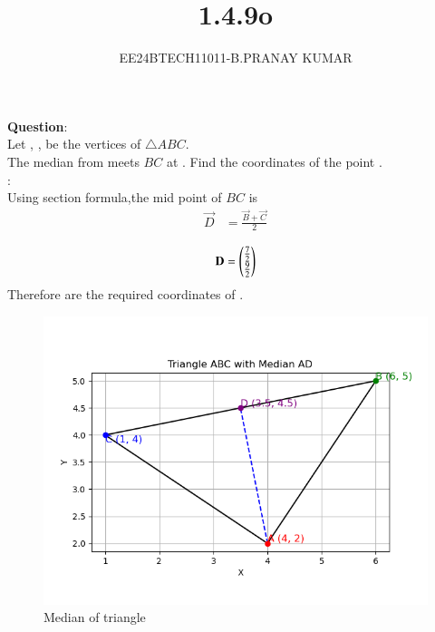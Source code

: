 \documentclass[journal]{IEEEtran}
\begin{document}

\vspace{3cm}

\title{1.4.9o}
\author{EE24BTECH11011-B.PRANAY KUMAR
}
 \maketitle
{\let\newpage\relax\maketitle}

\renewcommand{\thefigure}{\theenumi}
\renewcommand{\thetable}{\theenumi}
\setlength{\intextsep}{10pt} %


\renewcommand{\thetable}{\theenumi}




\textbf{Question}:\\
Let  ,  ,   be the vertices of \(\triangle ABC\). \\
The median from  meets \(BC\) at . Find the coordinates of the point .\\
\solution:\\
Using section formula,the mid point of $BC$ is
\begin{align}
\vec{D} &= \frac{\vec{B} + \vec{C}}{2}\\
\end{align}
\begin{align}
    \mathbf{D} = \begin{pmatrix}{\frac{7}{2}}\\{\frac{9}{2}}\end{pmatrix}
\end{align}
Therefore  are the required coordinates of .
\begin{figure}[h!]
   \centering
   \includegraphics[width=0.7\linewidth]{figs/triangle_plot.png}
   \caption{Median of triangle}
\end{figure}
\end{document}
